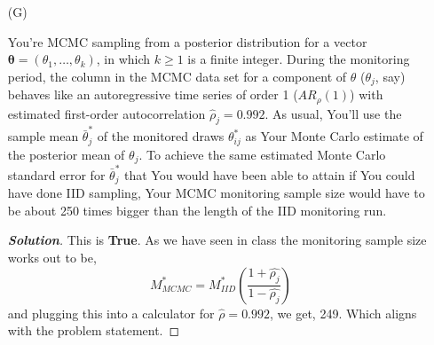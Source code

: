 \documentclass[12pt]{article}
\newcommand{\lrp}[1]{\left(#1\right)}
\newenvironment{solution}{\begin{tcolorbox}[breakable]\begin{proof}[\textbf{\textit{Solution}}] }{\end{proof}\end{tcolorbox}}
\begin{document}
\begin{itemize}
\item[(G)]

You're MCMC sampling from a posterior distribution for a vector $\bm{ \theta } = ( \theta_1, \dots, \theta_k )$, in which $k \ge 1$ is a finite integer. During the monitoring period, the column in the MCMC data set for a component of $\theta$ ($\theta_j$, say) behaves like an autoregressive time series of order 1 ($AR_\rho ( 1 )$) with estimated first-order autocorrelation $\hat{ \rho }_j = 0.992$. As usual, You'll use the sample mean $\bar{ \theta }_j^*$ of the monitored draws $\theta_{ ij }^*$ as Your Monte Carlo estimate of the posterior mean of $\theta_j$. To achieve the same estimated Monte Carlo standard error for $\bar{ \theta }_j^*$ that You would have been able to attain if You could have done IID sampling, Your MCMC monitoring sample size would have to be about 250 times bigger than the length of the IID monitoring run.

\begin{solution}
    This is \textbf{True}. As we have seen in class the monitoring sample size works out to be,
    \[M^{*}_{MCMC} = M^{*}_{IID}\lrp{\dfrac{1 + \hat{\rho_j}}{1 - \hat{\rho_j}}}\]
    and plugging this into a calculator for $\hat{\rho} = 0.992$, we get, 249. Which aligns with the problem statement. 
\end{solution}

\end{itemize}
\end{document}
